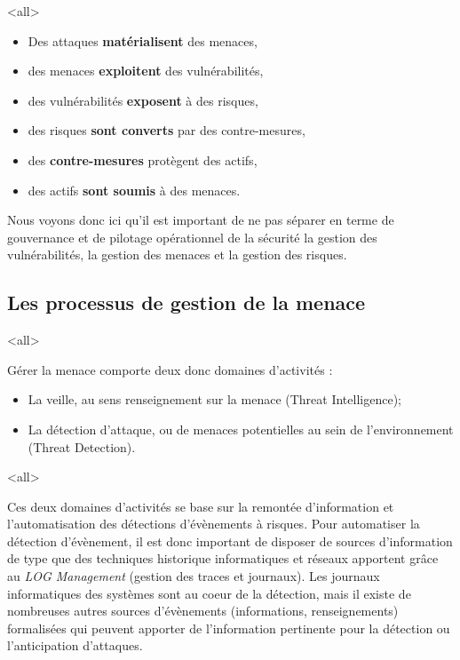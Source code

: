 
\mode<all>{}

\begin{itemize}
  \item Des attaques \textbf{matérialisent} des menaces,
  \item des menaces \textbf{exploitent} des vulnérabilités,
  \item des vulnérabilités \textbf{exposent} à des risques,
  \item des risques\textbf{ sont converts }par des contre-mesures,
  \item des \textbf{contre-mesures }protègent des actifs,
  \item des actifs \textbf{sont  soumis }à  des menaces.
\end{itemize}

Nous voyons donc ici qu'il est important de ne pas séparer en terme de gouvernance et de pilotage opérationnel de la sécurité la gestion des vulnérabilités, la gestion des menaces et la gestion des risques.




\subsection{Les processus de gestion de la menace}

\mode<all>{
{
Gérer la menace comporte deux donc domaines d'activités :
\begin{itemize}
  \item La veille, au sens renseignement sur la menace (Threat Intelligence);
  \item La détection d'attaque, ou de menaces potentielles au sein de l'environnement (Threat Detection).
\end{itemize}
}}%

\mode<all>{}

Ces deux domaines d'activités se base sur la remontée d'information et l'automatisation des détections d'évènements à risques.  Pour automatiser la détection d'évènement, il est donc important de disposer de sources d'information de type  que des techniques historique informatiques et réseaux  apportent grâce au \textit{LOG  Management} (gestion des traces et journaux). Les journaux informatiques des systèmes sont au coeur de la détection, mais il existe de nombreuses autres sources d'évènements (informations,  renseignements) formalisées qui peuvent apporter de l'information pertinente pour la détection ou l'anticipation d'attaques.

